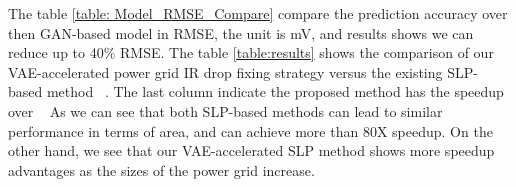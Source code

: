 \begin{table}[h]
	\begin{center} %
		\caption{ Comparison of the proposed VAE-accelerated SLP optimization method against the existing method}
		\label{table:results}
		\center
	\end{center}
	\vspace{-0.1in}
\end{table}
      The table \ref{table: Model_RMSE_Compare}  compare the prediction accuracy over then GAN-based model in RMSE, the unit is mV, and results shows we can reduce up to 40\% RMSE. 
      The table \ref{table:results} shows the comparison of our VAE-accelerated power grid IR drop fixing strategy versus the existing SLP-based method~\cite{Sukharev:2019pg} . The last column indicate
      the proposed method has the speedup over ~\cite{Sukharev:2019pg}
      As we can see that both SLP-based
      methods can lead to similar performance in terms of area,  and can achieve more than 80X speedup.  On the other hand, we see that our VAE-accelerated SLP method shows more speedup advantages as the sizes of the power grid increase.
      








